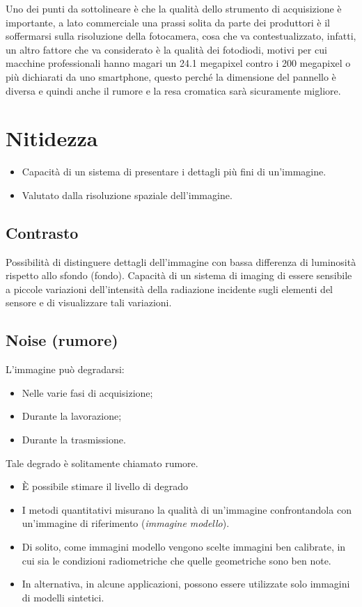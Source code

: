 \documentclass{report}
\begin{document}
Uno dei punti da sottolineare è che la qualità dello strumento di
acquisizione è importante, a lato commerciale una prassi solita da parte
dei produttori è il soffermarsi sulla risoluzione della fotocamera, cosa
che va contestualizzato, infatti, un altro fattore che va considerato è
la qualità dei fotodiodi, motivi per cui macchine professionali hanno
magari un 24.1 megapixel contro i 200 megapixel o più
dichiarati da uno smartphone, questo perché la dimensione del pannello
è diversa e quindi anche il rumore e la resa cromatica sarà sicuramente
migliore.

\section{Nitidezza}
\label{sec:nitidezza}

\begin{itemize}
\item Capacità di un sistema di presentare i dettagli più fini di
  un'immagine.
\item Valutato dalla risoluzione spaziale dell'immagine.
\end{itemize}

\subsection{Contrasto}
\label{sec:contrasto}

Possibilità di distinguere dettagli dell'immagine con bassa differenza
di luminosità rispetto allo sfondo (fondo). Capacità di un sistema di
imaging di essere sensibile a piccole variazioni dell'intensità della
radiazione incidente sugli elementi del sensore e di visualizzare tali
variazioni.

\subsection{Noise (rumore)}
\label{sec:noise}
L'immagine può degradarsi:
\begin{itemize}
\item Nelle varie fasi di acquisizione;
\item Durante la lavorazione;
\item Durante la trasmissione.
\end{itemize}
Tale degrado è solitamente chiamato rumore.
\begin{itemize}
\item È possibile stimare il livello di degrado
\item I metodi quantitativi misurano la qualità di un'immagine
  confrontandola con un'immagine di riferimento (\emph{immagine
    modello}).
\item Di solito, come immagini modello vengono scelte immagini ben
  calibrate, in cui sia le condizioni radiometriche che quelle
  geometriche sono ben note.
\item In alternativa, in alcune applicazioni, possono essere utilizzate
  solo immagini di modelli sintetici.
\end{itemize}
\end{document}
